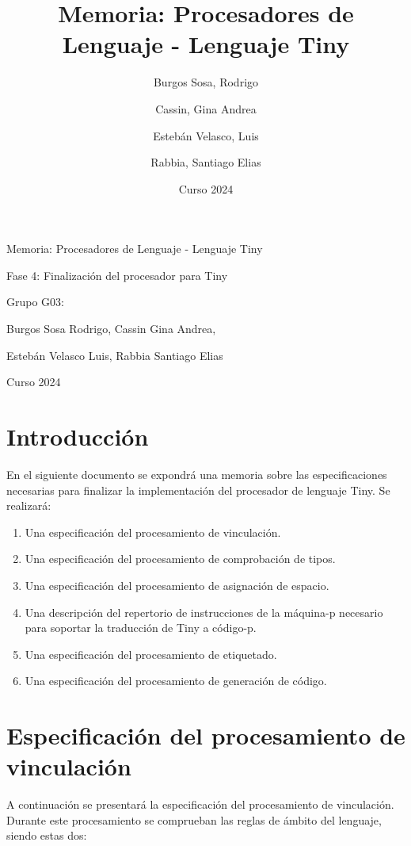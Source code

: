 \documentclass[11pt]{article}
\title{Memoria: Procesadores de Lenguaje - Lenguaje Tiny}
\author{Burgos Sosa, Rodrigo \and Cassin, Gina Andrea \and Estebán Velasco, Luis \and Rabbia, Santiago Elias}
\date{Curso 2024}
\begin{document}
\begin{titlepage}
    \centering
    {\Huge Memoria: Procesadores de Lenguaje - Lenguaje Tiny \par}
    \vspace{1cm}
    {\Large Fase 4: Finalización del procesador para Tiny \par}
    \vspace{2cm}
    {\Large Grupo G03: \par}
    {\Large Burgos Sosa Rodrigo, Cassin Gina Andrea, \par}
    {\Large Estebán Velasco Luis, Rabbia Santiago Elias \par}
    \vspace{2cm}
    {\Large Curso 2024 \par}
\end{titlepage}
\thispagestyle{empty}

    \newpage

    \section{Introducción}
        En el siguiente documento se expondrá una memoria sobre las especificaciones necesarias para finalizar la implementación del procesador de lenguaje Tiny.         
        Se realizará:
        \begin{enumerate}
            \item Una especificación del procesamiento de vinculación.
            \item Una especificación del procesamiento de comprobación de tipos.
            \item Una especificación del procesamiento de asignación de espacio.
            \item Una descripción del repertorio de instrucciones de la máquina-p necesario para soportar la traducción de Tiny a código-p.
            \item Una especificación del procesamiento de etiquetado.
            \item Una especificación del procesamiento de generación de código.
        \end{enumerate}

    \section{Especificación del procesamiento de vinculación}
        A continuación se presentará la especificación del procesamiento de vinculación. Durante este procesamiento se comprueban las reglas de ámbito del lenguaje, siendo estas dos:
        
\end{document}

